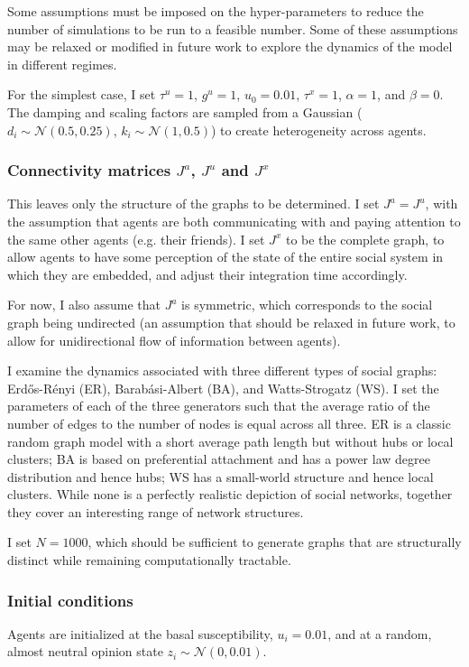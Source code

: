 \documentclass[]{article}
\begin{document}
Some assumptions must be imposed on the hyper-parameters to reduce the number of simulations to be run to a feasible number. Some of these assumptions may be relaxed or modified in future work to explore the dynamics of the model in different regimes.

For the simplest case, I set $\tau^u = 1$, $g^u = 1$, $u_0=0.01$, $\tau^x = 1$, $\alpha = 1$, and $\beta = 0$. The damping and scaling factors are sampled from a Gaussian ($d_i \sim \mathcal{N}(0.5,0.25)$, $k_i \sim \mathcal{N}(1,0.5)$) to create heterogeneity across agents.

\subsubsection{Connectivity matrices $J^a$, $J^u$ and $J^x$}

This leaves only the structure of the graphs to be determined. I set $J^a = J^u$, with the assumption that agents are both communicating with and paying attention to the same other agents (e.g. their friends). I set $J^x$ to be the complete graph, to allow agents to have some perception of the state of the entire social system in which they are embedded, and adjust their integration time accordingly.

For now, I also assume that $J^a$ is symmetric, which corresponds to the social graph being undirected (an assumption that should be relaxed in future work, to allow for unidirectional flow of information between agents).

I examine the dynamics associated with three different types of social graphs: Erdős-Rényi (ER), Barabási-Albert (BA), and Watts-Strogatz (WS). I set the parameters of each of the three generators such that the average ratio of the number of edges to the number of nodes is equal across all three. ER is a classic random graph model with a short average path length but without hubs or local clusters; BA is based on preferential attachment and has a power law degree distribution and hence hubs; WS has a small-world structure and hence local clusters. While none is a perfectly realistic depiction of social networks, together they cover an interesting range of network structures. 

I set $N = 1000$, which should be sufficient to generate graphs that are structurally distinct while remaining computationally tractable. 

\subsubsection{Initial conditions}
Agents are initialized at the basal susceptibility, $u_i = 0.01$, and at a random, almost neutral opinion state $z_i \sim \mathcal{N}(0, 0.01)$.
\end{document}
